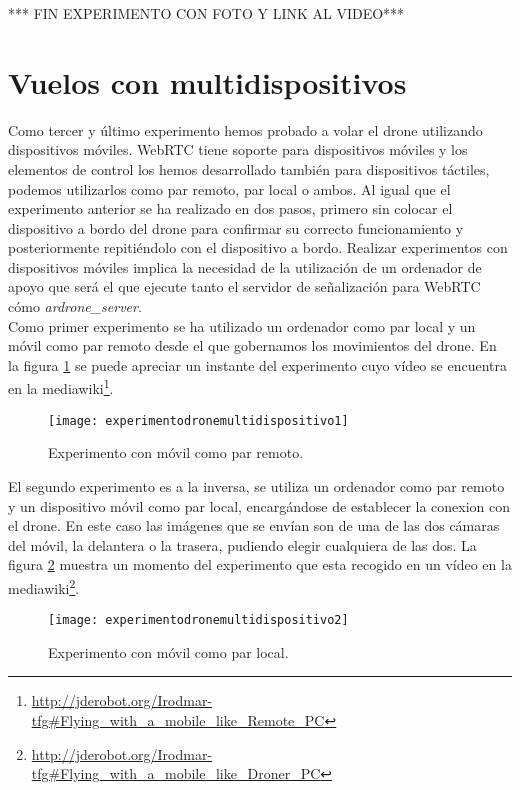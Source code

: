 *** FIN EXPERIMENTO CON FOTO Y LINK AL VIDEO***


\section{Vuelos con multidispositivos}

Como tercer y último experimento hemos probado a volar el drone utilizando dispositivos móviles. WebRTC tiene soporte para dispositivos móviles y los elementos de control los hemos desarrollado también para dispositivos táctiles, podemos utilizarlos como par remoto, par local o ambos. Al igual que el experimento anterior se ha realizado en dos pasos, primero sin colocar el dispositivo a bordo del drone para confirmar su correcto funcionamiento y posteriormente repitiéndolo con el dispositivo a bordo. Realizar experimentos con dispositivos móviles implica la necesidad de la utilización de un ordenador de apoyo que será el que ejecute tanto el servidor de señalización para WebRTC cómo \emph{ardrone\_server}.\\

Como primer experimento se ha utilizado un ordenador como par local y un móvil como par remoto desde el que gobernamos los movimientos del drone. En la figura \ref{fig:experimentodronemultidispositivo1} se puede apreciar un instante del experimento cuyo vídeo se encuentra en la mediawiki\footnote{\url{http://jderobot.org/Irodmar-tfg\#Flying\_with\_a\_mobile\_like\_Remote\_PC}}.\\

\begin{figure}[h!]
\centering
\texttt{[image: experimentodronemultidispositivo1]}
\caption{Experimento con móvil como par remoto.}
\label{fig:experimentodronemultidispositivo1}
\end{figure}

El segundo experimento es a la inversa, se utiliza un ordenador como par remoto y un dispositivo móvil como par local, encargándose de establecer la conexion con el drone. En este caso las imágenes que se envían son de una de las dos cámaras del móvil, la delantera o la trasera, pudiendo elegir cualquiera de las dos. La figura \ref{fig:experimentodronemultidispositivo2} muestra un momento del experimento que esta recogido en un vídeo en la mediawiki\footnote{\url{http://jderobot.org/Irodmar-tfg#Flying_with_a_mobile_like_Droner_PC}}.\\

\begin{figure}[h!]
\centering
\texttt{[image: experimentodronemultidispositivo2]}
\caption{Experimento con móvil como par local.}
\label{fig:experimentodronemultidispositivo2}
\end{figure}